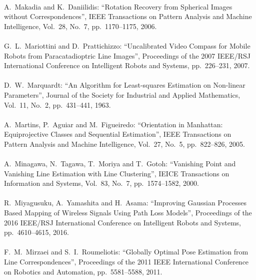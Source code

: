 \begin{mythebibliography}{}
\leavevmode \\A.~Makadia and K.~Daniilidis:
\newblock ``Rotation Recovery from Spherical Images without Correspondences'',
\newblock IEEE Transactions on Pattern Analysis and Machine Intelligence, Vol.~28, No.~7, pp.~1170--1175, 2006.
\\

\leavevmode \\G.~L.~Mariottini and D.~Prattichizzo:
\newblock ``Uncalibrated Video Compass for Mobile Robots from Paracatadioptric Line Images'',
\newblock Proceedings of the 2007 IEEE/RSJ International Conference on Intelligent Robots and Systems, pp.~226--231, 2007.
\\

\leavevmode \\D.~W.~Marquardt:
\newblock ``An Algorithm for Least-squares Estimation on Non-linear Parameters'',
\newblock Journal of the Society for Industrial and Applied Mathematics, Vol.~11, No.~2, pp.~431--441, 1963.
\\

\leavevmode \\A.~Martins, P.~Aguiar and M.~Figueiredo:
\newblock ``Orientation in Manhattan: Equiprojective Classes and Sequential Estimation'',
\newblock IEEE Transactions on Pattern Analysis and Machine Intelligence, Vol.~27, No.~5, pp.~822--826, 2005.
\\

\leavevmode \\A.~Minagawa, N.~Tagawa, T.~Moriya and T.~Gotoh:
\newblock ``Vanishing Point and Vanishing Line Estimation with Line Clustering'',
\newblock IEICE Transactions on Information and Systems, Vol.~83, No.~7, pp.~1574--1582, 2000.
\\

\leavevmode \\R.~Miyagusuku, A.~Yamashita and H.~Asama:
\newblock ``Improving Gaussian Processes Based Mapping of Wireless Signals Using Path Loss Models'',
\newblock Proceedings of the 2016 IEEE/RSJ International Conference on Intelligent Robots and Systems, pp.~4610--4615, 2016.
\\

\leavevmode \\F.~M.~Mirzaei and S.~I.~Roumeliotis:
\newblock ``Globally Optimal Pose Estimation from Line Correspondences'',
\newblock Proceedings of the 2011 IEEE International Conference on Robotics and Automation, pp.~5581--5588, 2011.
\\


\end{mythebibliography}
